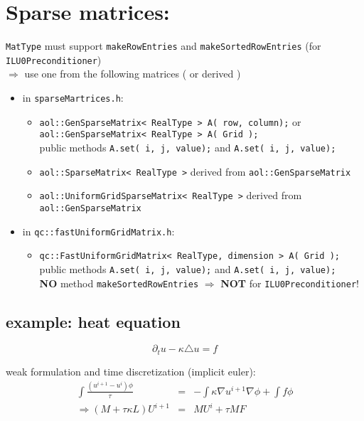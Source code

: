 \section {Sparse matrices: }
{\tt MatType} must support {\tt makeRowEntries} and {\tt makeSortedRowEntries} (for {\tt ILU0Preconditioner})\\
$\Rightarrow$ use one from the following matrices ( or derived )
\begin{itemize}
\item in {\tt sparseMartrices.h}:
\begin{itemize}
\item {\tt aol::GenSparseMatrix< RealType > A( row, column);} or \\ {\tt aol::GenSparseMatrix< RealType > A( Grid );}\\
public methods {\tt A.set( i, j, value);} and {\tt A.set( i, j, value);}
\item {\tt aol::SparseMatrix< RealType >} derived from {\tt aol::GenSparseMatrix}
\item {\tt aol::UniformGridSparseMatrix< RealType >} derived from {\tt aol::GenSparseMatrix}
\end{itemize}
\item in {\tt qc::fastUniformGridMatrix.h}:
\begin{itemize}
\item {\tt qc::FastUniformGridMatrix< RealType, dimension > A( Grid );} \\
public methods {\tt A.set( i, j, value);} and {\tt A.set( i, j, value);}\\
{\bf NO} method {\tt makeSortedRowEntries} $\Rightarrow$ {\bf NOT} for {\tt ILU0Preconditioner}!
\end{itemize}
\end{itemize}


\subsection{ example: heat equation }

\[ \partial_t u - \kappa \triangle u = f \]

weak formulation and time discretization (implicit euler):
\begin{eqnarray*} \int \frac{ \left(u^{i+1} - u^i\right) \phi}{\tau} & = & - \int \kappa \nabla u^{i+1} \nabla \phi + \int f \phi \\
\Rightarrow (M + \tau \kappa L) U^{i+1} & = & M U^i + \tau M F
\end{eqnarray*}

